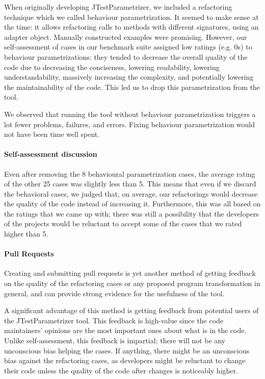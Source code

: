 When originally developing JTestParametrizer, we included a refactoring technique which we called behaviour parametrization. It seemed to make sense at the time: it allows refactoring calls to methods with different signatures, using an adapter object. Manually constructed examples were promising. However, our self-assessment of cases in our benchmark suite assigned low ratings (e.g. 0s) to behaviour parametrizations: they tended to decrease the overall quality of the code due to decreasing the conciseness, lowering readability, lowering understandability, massively increasing the complexity, and potentially lowering the maintainability of the code. This led us to drop this parametrization from the tool.

We observed that running the tool without behaviour parametrization triggers a lot fewer problems, failures, and errors. Fixing behaviour parametrization would not have been time well spent.


\paragraph{Self-assessment discussion}
Even after removing the 8 behavioural parametrization  cases, the average rating of the other 25 cases was slightly less than 5. This means that even if we discard the behavioral cases, we judged that, on average, our refactorings would decrease the quality of the code instead of increasing it. Furthermore, this was all based on the ratings that we came up with; there was still a possibility that the developers of the projects would be reluctant to accept some of the cases that we rated higher than 5.

\paragraph{Pull Requests}

Creating and submitting pull requests is yet another method of getting feedback on the quality of the refactoring cases or any proposed program transformation in general, and can provide strong evidence for the usefulness of the tool.

A significant advantage of this method is getting feedback from potential users of the JTestParametrizer tool. This feedback is high-value since the code maintainers' opinions are the most important ones about what is in the code. Unlike self-assessment, this feedback is impartial; there will not be any unconscious bias helping the cases. If anything, there might be an unconscious bias against the refactoring cases, as developers might be reluctant to change their code unless the quality of the code after changes is noticeably higher.

